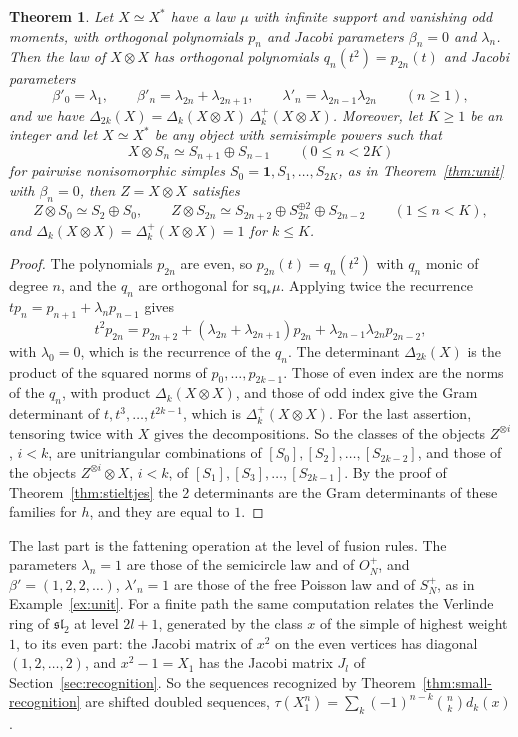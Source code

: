 \documentclass[11pt,reqno]{amsart}
\newtheorem{theorem}{Theorem}[section]
\theoremstyle{definition}
\newcommand{\one}{\mathbf 1}
\begin{document}
\begin{theorem}\label{thm:doubling-jacobi}
Let $X\simeq X^*$ have a law $\mu$ with infinite support and vanishing odd moments, with orthogonal polynomials $p_n$ and Jacobi parameters $\beta_n=0$ and $\lambda_n$. Then the law of $X\otimes X$ has orthogonal polynomials $q_n(t^2)=p_{2n}(t)$ and Jacobi parameters
\[
    \beta'_0=\lambda_1,\qquad\beta'_n=\lambda_{2n}+\lambda_{2n+1},\qquad\lambda'_n=\lambda_{2n-1}\lambda_{2n}\qquad(n\geq1),
\]
and we have $\Delta_{2k}(X)=\Delta_k(X\otimes X)\,\Delta_k^+(X\otimes X)$. Moreover, let $K\geq1$ be an integer and let $X\simeq X^*$ be any object with semisimple powers such that
\[
       X\otimes S_n\simeq S_{n+1}\oplus S_{n-1}\qquad(0\leq n<2K)
\]
for pairwise nonisomorphic simples $S_0=\one,S_1,\ldots,S_{2K}$, as in Theorem~\ref{thm:unit} with $\beta_n=0$, then $Z=X\otimes X$ satisfies
\[
   Z\otimes S_0\simeq S_2\oplus S_0,\qquad Z\otimes S_{2n}\simeq S_{2n+2}\oplus S_{2n}^{\oplus2}\oplus S_{2n-2}\qquad(1\leq n<K),
\]
and $\Delta_k(X\otimes X)=\Delta_k^+(X\otimes X)=1$ for $k\leq K$.
\end{theorem}

\begin{proof}
The polynomials $p_{2n}$ are even, so $p_{2n}(t)=q_n(t^2)$ with $q_n$ monic of degree $n$, and the $q_n$ are orthogonal for $\mathrm{sq}_*\mu$. Applying twice the recurrence $tp_n=p_{n+1}+\lambda_np_{n-1}$ gives
\[
 t^2p_{2n}=p_{2n+2}+(\lambda_{2n}+\lambda_{2n+1})p_{2n}+\lambda_{2n-1}\lambda_{2n}p_{2n-2},
\]
with $\lambda_0=0$, which is the recurrence of the $q_n$. The determinant $\Delta_{2k}(X)$ is the product of the squared norms of $p_0,\ldots,p_{2k-1}$. Those of even index are the norms of the $q_n$, with product $\Delta_k(X\otimes X)$, and those of odd index give the Gram determinant of $t,t^3,\ldots,t^{2k-1}$, which is $\Delta_k^+(X\otimes X)$. For the last assertion, tensoring twice with $X$ gives the decompositions. So the classes of the objects $Z^{\otimes i}$, $i<k$, are unitriangular combinations of $[S_0],[S_2],\ldots,[S_{2k-2}]$, and those of the objects $Z^{\otimes i}\otimes X$, $i<k$, of $[S_1],[S_3],\ldots,[S_{2k-1}]$. By the proof of Theorem~\ref{thm:stieltjes} the 2 determinants are the Gram determinants of these families for $h$, and they are equal to $1$.
\end{proof}

The last part is the fattening operation at the level of fusion rules. The parameters $\lambda_n=1$ are those of the semicircle law and of $O_N^+$, and $\beta'=(1,2,2,\ldots)$, $\lambda'_n=1$ are those of the free Poisson law and of $S_N^+$, as in Example~\ref{ex:unit}. For a finite path the same computation relates the Verlinde ring of $\mathfrak{sl}_2$ at level $2l+1$, generated by the class $x$ of the simple of highest weight $1$, to its even part: the Jacobi matrix of $x^2$ on the even vertices has diagonal $(1,2,\ldots,2)$, and $x^2-1=X_1$ has the Jacobi matrix $J_l$ of Section~\ref{sec:recognition}. So the sequences recognized by Theorem~\ref{thm:small-recognition} are shifted doubled sequences, $\tau(X_1^n)=\sum_k(-1)^{n-k}\binom nkd_k(x)$.
\end{document}
